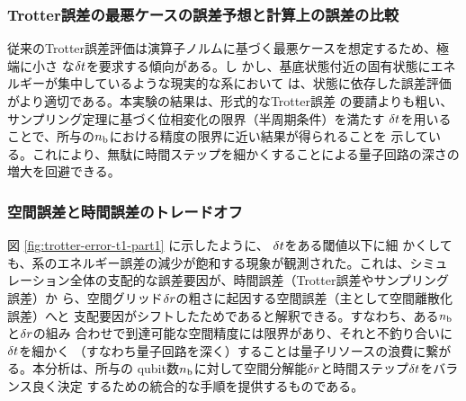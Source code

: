 \documentclass[wabun2025.tex]{subfiles}
\begin{document}
\subsubsection{Trotter誤差の最悪ケースの誤差予想と計算上の誤差の比較}
従来のTrotter誤差評価は演算子ノルムに基づく最悪ケースを想定するため、極端に小さ
な$\delta t$を要求する傾向がある\cite{Burgarth2024.PhysRevResearch.6.043155}。し
かし、基底状態付近の固有状態にエネルギーが集中しているような現実的な系において
は、状態に依存した誤差評価がより適切である。本実験の結果は、形式的なTrotter誤差
の要請よりも粗い、サンプリング定理に基づく位相変化の限界（半周期条件）を満たす
$\delta t$を用いることで、所与の$n_{\mathrm{b}}$における精度の限界に近い結果が得られることを
示している。これにより、無駄に時間ステップを細かくすることによる量子回路の深さの
増大を回避できる。

\subsubsection{空間誤差と時間誤差のトレードオフ}
図 \ref{fig:trotter-error-t1-part1} に示したように、 $\delta t$をある閾値以下に細
かくしても、系のエネルギー誤差の減少が飽和する現象が観測された。これは、シミュ
レーション全体の支配的な誤差要因が、時間誤差（Trotter誤差やサンプリング誤差）か
ら、空間グリッド$\delta r$の粗さに起因する空間誤差（主として空間離散化誤差）へと
支配要因がシフトしたためであると解釈できる。すなわち、ある$n_{\mathrm{b}}$と$\delta r$の組み
合わせで到達可能な空間精度には限界があり、それと不釣り合いに$\delta t$を細かく
（すなわち量子回路を深く）することは量子リソースの浪費に繋がる。本分析は、所与の
qubit数$n_{\mathrm{b}}$に対して空間分解能$\delta r$と時間ステップ$\delta t$をバランス良く決定
するための統合的な手順を提供するものである。
\end{document}
